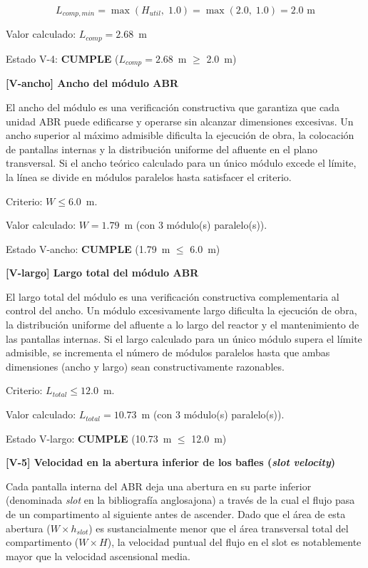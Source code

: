 \documentclass[12pt,a4paper]{article}
\begin{document}
\begin{equation}
L_{comp,min} = \max\!\left(H_{util},\; 1.0\right) = \max\!\left(2.0,\; 1.0\right) = 2.0 \text{ m}
\end{equation}

Valor calculado: $L_{comp} = 2.68$~m

Estado V-4: \textbf{CUMPLE} ($L_{comp} = 2.68$~m $\geq$ 2.0~m)

\textbf{[V-ancho] Ancho del módulo ABR}

El ancho del módulo es una verificación constructiva que garantiza que cada unidad ABR puede edificarse y operarse sin alcanzar dimensiones excesivas. Un ancho superior al máximo admisible dificulta la ejecución de obra, la colocación de pantallas internas y la distribución uniforme del afluente en el plano transversal. Si el ancho teórico calculado para un único módulo excede el límite, la línea se divide en módulos paralelos hasta satisfacer el criterio.

Criterio: $W \leq 6.0$~m.

Valor calculado: $W = 1.79$~m (con $3$ módulo(s) paralelo(s)).

Estado V-ancho: \textbf{CUMPLE} (1.79~m $\leq$ 6.0~m)

\textbf{[V-largo] Largo total del módulo ABR}

El largo total del módulo es una verificación constructiva complementaria al control del ancho. Un módulo excesivamente largo dificulta la ejecución de obra, la distribución uniforme del afluente a lo largo del reactor y el mantenimiento de las pantallas internas. Si el largo calculado para un único módulo supera el límite admisible, se incrementa el número de módulos paralelos hasta que ambas dimensiones (ancho y largo) sean constructivamente razonables.

Criterio: $L_{total} \leq 12.0$~m.

Valor calculado: $L_{total} = 10.73$~m (con $3$ módulo(s) paralelo(s)).

Estado V-largo: \textbf{CUMPLE} (10.73~m $\leq$ 12.0~m)

\textbf{[V-5] Velocidad en la abertura inferior de los bafles (\textit{slot velocity})}

Cada pantalla interna del ABR deja una abertura en su parte inferior (denominada \textit{slot} en la bibliografía anglosajona) a través de la cual el flujo pasa de un compartimento al siguiente antes de ascender. Dado que el área de esta abertura ($W \times h_{slot}$) es sustancialmente menor que el área transversal total del compartimento ($W \times H$), la velocidad puntual del flujo en el slot es notablemente mayor que la velocidad ascensional media.
\end{document}
